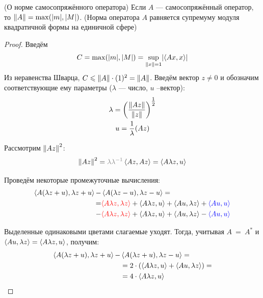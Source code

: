\documentclass[12pt]{article}
\begin{document}
		\begin{state}
			(О норме самосопряжённого оператора) Если $A$ --- самосопряжённый оператор, то 
			$\left\| A \right\| = \max(|m|, |M|)$. 
			(Норма оператора $A$ равняется супремуму модуля квадратичной формы на единичной сфере)
		\end{state}
		\begin{proof}
			Введём 
			$$C = \max(|m|, |M|) = \underset{\left\| x \right\| = 1}{\sup} |\!\left\langle Ax, x \right\rangle\!|$$
			Из неравенства Шварца, $C \leqslant \left\| A \right\| \cdot (1)^2 = \left\| A \right\|$.
			Введём вектор $z \neq 0$ и обозначим соответствующие ему параметры ($\lambda$ --- число, $u$ --вектор):
			\begin{gather*}
				\lambda = \left(\frac{\left\| Az \right\|}{\left\| z \right\|}\right)^{\tfrac{1}{2}} \\
				u = \frac{1}{\lambda}(Az)
			\end{gather*}
		
			Рассмотрим $\left\| Az \right\|^2$:
			\begin{equation} \label{eq:scalprod}
				\norm{Az}^2 = {\color{gray} \lambda\lambda^{-1}} \scal{Az}{Az} = \scal{A \lambda z}{u}
			\end{equation}
		
			Проведём некоторые промежуточные вычисления:
			\begin{equation*}
			\begin{split}
				\left\langle A(\lambda z + u), \lambda z + u \right\rangle - &\left\langle A(\lambda z - u), \lambda z - u \right\rangle = \\
				  = &{\color{red}\left\langle A \lambda z, \lambda z \right\rangle} + \left\langle A\lambda z, u \right\rangle + \left\langle Au, \lambda z \right\rangle + {\color{blue}\left\langle Au, u \right\rangle} \\
				  - &{\color{red}\left\langle A \lambda z, \lambda z \right\rangle} + \left\langle A\lambda z, u \right\rangle + \left\langle Au, \lambda z \right\rangle - {\color{blue}\left\langle Au, u \right\rangle}
			\end{split}
			\end{equation*}
		
			Выделенные одинаковыми цветами слагаемые уходят. Тогда, учитывая $A~=~A^{*}$ и 
			$\left\langle Au, \lambda z \right\rangle = \left\langle A\lambda z, u \right\rangle$, получим:
			\begin{equation} \label{eq:scalproddiff}
			\begin{split}
				\left\langle A(\lambda z + u), \lambda z + u \right\rangle - &\left\langle A(\lambda z + u), \lambda z - u \right\rangle = \\
				 &= 2 \cdot \left(\left\langle A\lambda z, u \right\rangle + \left\langle Au, \lambda z \right\rangle\right) = \\
				 &= 4 \cdot \left\langle A\lambda z, u \right\rangle
			\end{split}
			\end{equation}


\end{proof}
\end{document}
